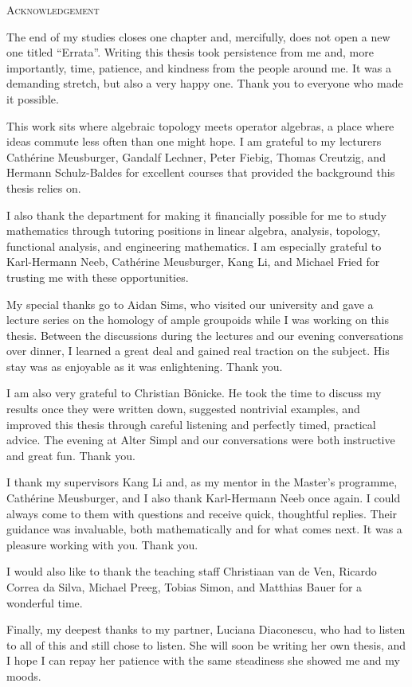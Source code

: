 \begin{center}
  \textsc{Acknowledgement}
\end{center}
\noindent

The end of my studies closes one chapter and, mercifully, does not open a new one titled “Errata”. Writing this thesis took persistence from me and, more importantly, time, patience, and kindness from the people around me. It was a demanding stretch, but also a very happy one. Thank you to everyone who made it possible.

This work sits where algebraic topology meets operator algebras, a place where ideas commute less often than one might hope. I am grateful to my lecturers Cathérine Meusburger, Gandalf Lechner, Peter Fiebig, Thomas Creutzig, and Hermann Schulz-Baldes for excellent courses that provided the background this thesis relies on.

I also thank the department for making it financially possible for me to study mathematics through tutoring positions in linear algebra, analysis, topology, functional analysis, and engineering mathematics. I am especially grateful to Karl-Hermann Neeb, Cathérine Meusburger, Kang Li, and Michael Fried for trusting me with these opportunities.

My special thanks go to Aidan Sims, who visited our university and gave a lecture series on the homology of ample groupoids while I was working on this thesis. Between the discussions during the lectures and our evening conversations over dinner, I learned a great deal and gained real traction on the subject. His stay was as enjoyable as it was enlightening. Thank you.

I am also very grateful to Christian Bönicke. He took the time to discuss my results once they were written down, suggested nontrivial examples, and improved this thesis through careful listening and perfectly timed, practical advice. The evening at Alter Simpl and our conversations were both instructive and great fun. Thank you.

I thank my supervisors Kang Li and, as my mentor in the Master’s programme, Cathérine Meusburger, and I also thank Karl-Hermann Neeb once again. I could always come to them with questions and receive quick, thoughtful replies. Their guidance was invaluable, both mathematically and for what comes next. It was a pleasure working with you. Thank you.

I would also like to thank the teaching staff Christiaan van de Ven, Ricardo Correa da Silva, Michael Preeg, Tobias Simon, and Matthias Bauer for a wonderful time.

Finally, my deepest thanks to my partner, Luciana Diaconescu, who had to listen to all of this and still chose to listen. She will soon be writing her own thesis, and I hope I can repay her patience with the same steadiness she showed me and my moods.
